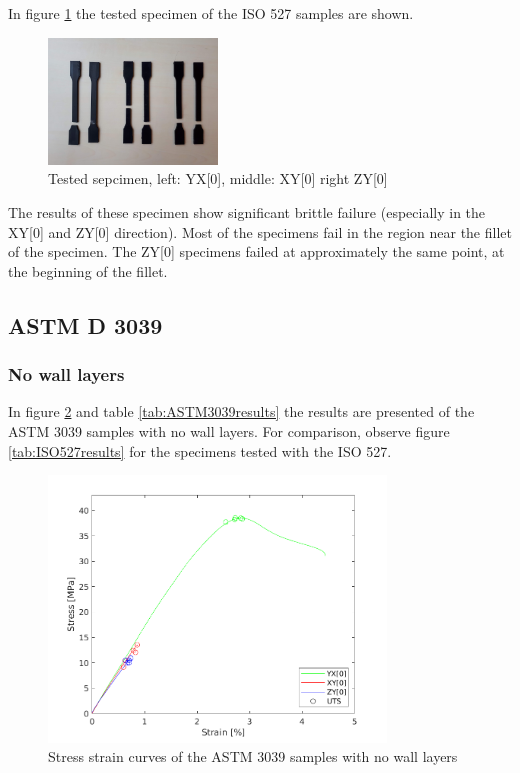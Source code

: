 In figure \ref{fig:ISO527specimen} the tested specimen of the ISO 527 samples are shown. 
\begin{figure}[H]
    \centering
    \includegraphics[width=0.40\textwidth]{chapter_5_Experimentaltesting/figures/imageISO.jpg}
    \caption{Tested sepcimen, left: YX[0], middle: XY[0] right ZY[0]}
    \label{fig:ISO527specimen}
\end{figure}
The results of these specimen show significant brittle failure (especially in the XY[0] and ZY[0] direction). Most of the specimens fail in the region near the fillet of the specimen. The ZY[0] specimens failed at approximately the same point, at the beginning of the fillet. 

\subsection{ASTM D 3039}
\subsubsection{No wall layers }
In figure \ref{fig:ASTM3039results} and table \ref{tab:ASTM3039results} the results are presented of the ASTM 3039 samples with no wall layers. For comparison, observe figure \ref{tab:ISO527results} for the specimens tested with the ISO 527. 

\begin{figure}[htb]
    \centering
    \includegraphics[width=0.80\textwidth]{chapter_5_Experimentaltesting/figures/ASTMnoTensiletests.png}
    \caption{Stress strain curves of the ASTM 3039 samples with no wall layers}
    \label{fig:ASTM3039results}
\end{figure}


